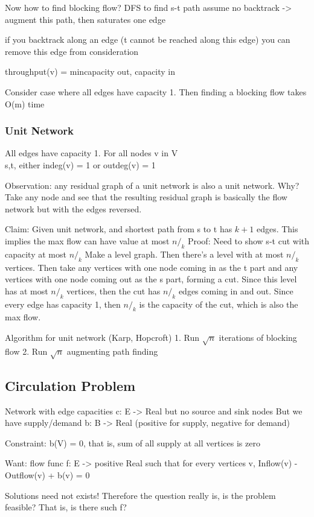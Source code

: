 Now how to find blocking flow?
DFS to find s-t path
	assume no backtrack -> augment this path, then saturates one edge

	if you backtrack along an edge (t cannot be reached along this edge)
		you can remove this edge from consideration

throughput(v) = min{capacity out, capacity in}

Consider case where all edges have capacity 1.  Then finding a blocking flow takes O(m) time


\subsubsection{Unit Network}
All edges have capacity 1.
For all nodes v in V\\{s,t}, either indeg(v) = 1 or outdeg(v) = 1

Observation: any residual graph of a unit network is also a unit network.  
Why?  Take any node and see that the resulting residual graph is basically the
flow network but with the edges reversed.

Claim: Given unit network, and shortest path from s to t has $k+1$ edges.  This
implies the max flow can have value at most $n/_k$
Proof: Need to show s-t cut with capacity at most $n/_k$
Make a level graph.  Then there's a level with at most $n/_k$ vertices.  Then
take any vertices with one node coming in as the t part and any vertices with
one node coming out as the s part, forming a cut.  Since this level has at most
$n/_k$ vertices, then the cut has $n/_k$ edges coming in and out.  Since every
edge has capacity 1, then $n/_k$ is the capacity of the cut, which is also the
max flow.

Algorithm for unit network (Karp, Hopcroft)
1. Run $\sqrt n$ iterations of blocking flow
2. Run $\sqrt n$ augmenting path finding


\subsection{Circulation Problem}
Network with edge capacities c: E -> Real but no source and sink nodes
But we have supply/demand b: B -> Real (positive for supply, negative for
demand)

Constraint: b(V) = 0, that is, sum of all supply at all vertices is zero

Want: flow func f: E -> positive Real such that for every vertices v,
	Inflow(v) - Outflow(v) + b(v) = 0

Solutions need not exists!
Therefore the question really is, is the problem feasible?  That is, is there
such f?

